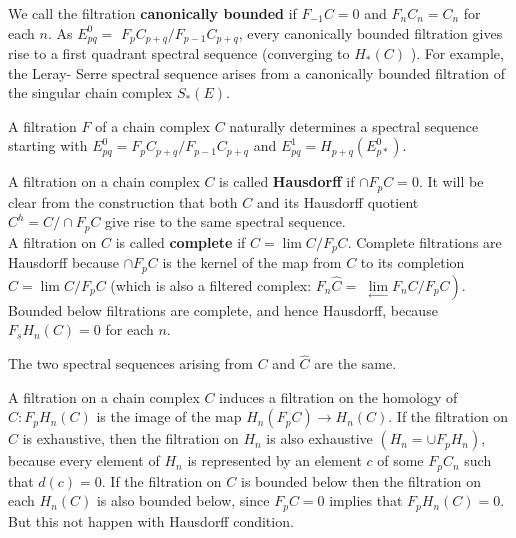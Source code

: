 \begin{example}
We call the filtration \textbf{canonically bounded} if $F_{-1} C=0$ and $F_n C_n=C_n$ for each $n$. As $E_{p q}^0=$ $F_p C_{p+q} / F_{p-1} C_{p+q}$, every canonically bounded filtration gives rise to a first quadrant spectral sequence (converging to $H_*(C)$ ). For example, the Leray- Serre spectral sequence arises from a canonically bounded filtration of the singular chain complex $S_*(E)$. %
\end{example}

\begin{theo}
A filtration $F$ of a chain complex $C$ naturally determines a spectral sequence starting with $E_{p q}^0=F_p C_{p+q} / F_{p-1} C_{p+q}$ and $E_{p q}^1=H_{p+q}\left(E_{p *}^0\right)$.    
\end{theo}

A filtration on a chain complex $C$ is called \textbf{Hausdorff} if $\cap F_p C=0$. It will be clear from the construction that both $C$ and its Hausdorff quotient $C^h=C / \cap F_p C$ give rise to the same spectral sequence.\\
A filtration on $C$ is called \textbf{complete} if $C=\lim C / F_p C$. Complete filtrations are Hausdorff because $\cap F_p C$ is the kernel of the map from $C$ to its completion $\widehat{C}=\operatorname{\operatorname {lim}} C / F_p C$ (which is also a filtered complex: $F_n \widehat{C}=$ $\left.\underset{\longleftarrow}{\lim } F_n C / F_p C\right)$. \\
Bounded below filtrations are complete, and hence Hausdorff, because $F_s H_n(C)=0$ for each $n$.

\begin{coro}
The two spectral sequences arising from $C$ and $\widehat{C}$ are the same.    
\end{coro}

A filtration on a chain complex $C$ induces a filtration on the homology of $C: F_p H_n(C)$ is the image of the map $H_n\left(F_p C\right) \rightarrow H_n(C)$. If the filtration on $C$ is exhaustive, then the filtration on $H_n$ is also exhaustive $\left(H_n=\cup F_p H_n\right)$, because every element of $H_n$ is represented by an element $c$ of some $F_p C_n$ such that $d(c)=0$. If the filtration on $C$ is bounded below then the filtration on each $H_n(C)$ is also bounded below, since $F_p C=0$ implies that $F_p H_n(C)=0$. But this not happen with Hausdorff condition.

